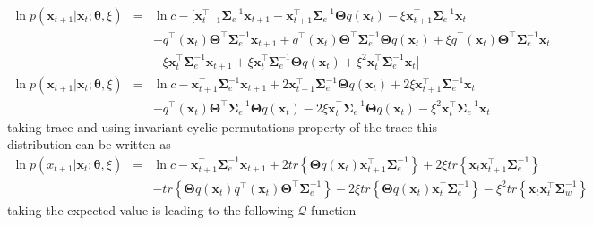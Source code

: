 \documentclass[]{article}
\begin{document}
\begin{eqnarray}
 \ln p(\mathbf x_{t+1} | \mathbf x_t;\boldsymbol\theta, \xi)&=&\ln c-[\mathbf x_{t+1}^\top\boldsymbol\Sigma_e^{-1}\mathbf x_{t+1}-\mathbf x_{t+1}^\top\boldsymbol\Sigma_e^{-1}\boldsymbol\Theta q(\mathbf x_t)-\xi \mathbf x_{t+1}^\top\boldsymbol\Sigma_e^{-1}\mathbf x_t \nonumber \\
&&- q^\top(\mathbf x_t)\boldsymbol\Theta^\top\boldsymbol\Sigma_e^{-1}\mathbf x_{t+1}+q^\top(\mathbf x_t)\boldsymbol\Theta^\top\boldsymbol\Sigma_e^{-1}\boldsymbol\Theta q(\mathbf x_t)+\xi q^\top(\mathbf x_t)\boldsymbol\Theta^\top \boldsymbol\Sigma_e^{-1}\mathbf x_t \nonumber\\
&&-\xi \mathbf x_t^\top\boldsymbol\Sigma_e^{-1}\mathbf x_{t+1}+\xi  \mathbf  x_t^\top\boldsymbol\Sigma_e^{-1}\boldsymbol\Theta q(\mathbf x_t)+\xi^2\mathbf x_t^\top\boldsymbol\Sigma_e^{-1}\mathbf x_t]
\end{eqnarray}
\begin{eqnarray}\label{eq:Qfunctioninter}
  \ln p(\mathbf x_{t+1} | \mathbf x_t;\boldsymbol\theta,\xi)&=&\ln c-\mathbf x_{t+1}^\top\boldsymbol\Sigma_e^{-1}\mathbf x_{t+1}+2\mathbf x_{t+1}^\top\boldsymbol\Sigma_e^{-1}\boldsymbol\Theta q( \mathbf x_t)+2\xi \mathbf x_{t+1}^\top\boldsymbol\Sigma_e^{-1}\mathbf x_t\nonumber \\
&&-q^\top(\mathbf x_t)\boldsymbol\Theta^\top \boldsymbol\Sigma_e^{-1}\boldsymbol\Theta q(\mathbf x_t)-2\xi \mathbf x_t^\top\boldsymbol\Sigma_e^{-1}\boldsymbol\Theta q(\mathbf x_t)-\xi^2\mathbf x_t^\top\boldsymbol\Sigma_e^{-1}\mathbf x_t
\end{eqnarray}
taking trace and using invariant cyclic permutations property of the trace this distribution can be written as 
 \begin{eqnarray}
   \ln p(x_{t+1} | \mathbf x_t;\boldsymbol\theta,\xi)&=&\ln c-\mathbf x_{t+1}^\top\boldsymbol\Sigma_e^{-1}\mathbf x_{t+1}+2 tr \left\lbrace  \boldsymbol\Theta q( \mathbf x_t)\mathbf x_{t+1}^\top\boldsymbol\Sigma_e^{-1}\right\rbrace  +2 \xi tr\left\lbrace \mathbf x_t\mathbf x_{t+1}^\top\boldsymbol\Sigma_e^{-1}\right\rbrace  \nonumber\\
 &&-tr \left\lbrace \boldsymbol\Theta q(\mathbf x_t)q^\top(\mathbf x_t)\boldsymbol\Theta^\top \boldsymbol\Sigma_e^{-1}\right\rbrace  -2\xi tr \left\lbrace \boldsymbol\Theta q(\mathbf x_t)  \mathbf x_t^\top\boldsymbol\Sigma_e^{-1} \right\rbrace -\xi^2 tr \left\lbrace\mathbf x_t\mathbf x_t^\top\boldsymbol\Sigma_w^{-1} \right\rbrace  \nonumber
 \end{eqnarray} 
taking the expected value is leading to the following  $\mathcal Q$-function
\end{document}
